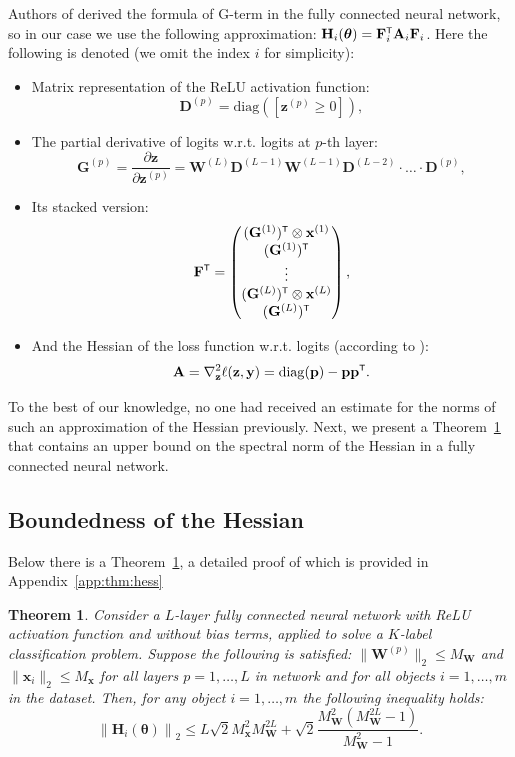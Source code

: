 \documentclass{article}
\newtheorem{theorem}{Theorem} %
\begin{document}
Authors of \cite{wu2022dissecting} derived the formula of G-term in the fully connected neural network, so in our case we use the following approximation: $\mathbf{H}_{i}(\boldsymbol{\theta}) = \mathbf{F}_i\T \mathbf{A}_i \mathbf{F}_i$. Here the following is denoted (we omit the index $i$ for simplicity):
\begin{itemize}
    \item Matrix representation of the ReLU activation function:
    \[ \mathbf{D}^{(p)} = \mathrm{diag}([\mathbf{z}^{(p)} \geqslant 0]), \]
    \item The partial derivative of logits w.r.t. logits at $p$-th layer:
    \[ \mathbf{G}^{(p)} = \dfrac{\partial \mathbf{z}}{\partial \mathbf{z}^{(p)}} = \mathbf{W}^{(L)} \mathbf{D}^{(L-1)} \mathbf{W}^{(L-1)} \mathbf{D}^{(L-2)} \cdot \ldots \cdot \mathbf{D}^{(p)}, \]
    \item Its stacked version:
    \[ \mathbf{F}\T = \begin{pmatrix}
        (\mathbf{G}^{(1)})\T \otimes \mathbf{x}^{(1)} \\
        (\mathbf{G}^{(1)})\T \\ 
        \vdots \\
        (\mathbf{G}^{(L)})\T \otimes \mathbf{x}^{(L)} \\
        (\mathbf{G}^{(L)})\T \\ 
    \end{pmatrix}, \]
    \item And the Hessian of the loss function w.r.t. logits (according to \cite{singla2019understanding}):
    \[ \mathbf{A} = \nabla^2_\mathbf{z} \ell(\mathbf{z}, \mathbf{y}) = \mathrm{diag}(\mathbf{p}) - \mathbf{p} \mathbf{p}\T. \]
\end{itemize}

To the best of our knowledge, no one had received an estimate for the norms of such an approximation of the Hessian previously. Next, we present a Theorem~\ref{thm:hess} that contains an upper bound on the spectral norm of the Hessian in a fully connected neural network.

\subsection{Boundedness of the Hessian}

Below there is a Theorem~\ref{thm:hess}, a detailed proof of which is provided in Appendix~\ref{app:thm:hess}

\begin{theorem}\label{thm:hess}
    Consider a $L$-layer fully connected neural network with ReLU activation function and without bias terms, applied to solve a $K$-label classification problem. Suppose the following is satisfied: $\| \mathbf{W}^{(p)} \|_2 \leqslant M_{\mathbf{W}}$ and $\| \mathbf{x}_i \|_2 \leqslant M_{\mathbf{x}}$ for all layers $p = 1, \ldots, L$ in network and for all objects $i = 1, \ldots, m$ in the dataset. Then, for any object $i = 1, \ldots, m$ the following inequality holds:
    \[ \left\| \mathbf{H}_i(\boldsymbol{\theta}) \right\|_2 \leqslant L \sqrt{2} M_{\mathbf{x}}^2 M_{\mathbf{W}}^{2L} + \sqrt{2} \dfrac{M_{\mathbf{W}}^2 (M_{\mathbf{W}}^{2L} - 1)}{M_{\mathbf{W}}^2 - 1}. \]
\end{theorem}
\end{document}
